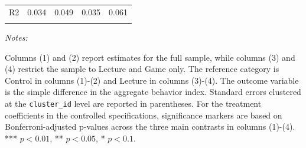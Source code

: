 \begin{table}[htbp]
\begin{tabular}{lcccc}
R2 & \num{0.034} & \num{0.049} & \num{0.035} & \num{0.061} \\
\\
\hline
\hline
\end{tabular}
{\begin{flushleft}\parbox{\textwidth}{\tiny \hspace*{0.1cm}
\textit{Notes:}} Columns (1) and (2) report estimates for the full sample, while columns (3) and (4) restrict the sample to Lecture and Game only. The reference category is Control in columns (1)-(2) and Lecture in columns (3)-(4). The outcome variable is the simple difference in the aggregate behavior index. Standard errors clustered at the \texttt{cluster\_id} level are reported in parentheses. For the treatment coefficients in the controlled specifications, significance markers are based on Bonferroni-adjusted p-values across the three main contrasts in columns (1)-(4). *** $p < 0.01$, ** $p < 0.05$, * $p < 0.1$.
\end{flushleft}}
\end{table}
